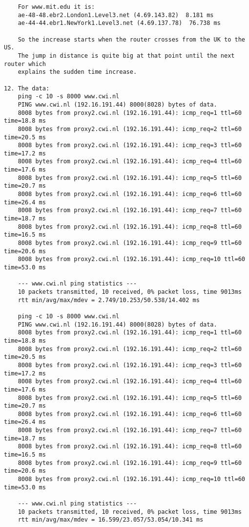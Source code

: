 \documentclass[12pt]{article} %
\begin{document}
\begin{verbatim}
    For www.mit.edu it is:
    ae-48-48.ebr2.London1.Level3.net (4.69.143.82)  8.181 ms 
    ae-44-44.ebr1.NewYork1.Level3.net (4.69.137.78)  76.738 ms 

    So the increase starts when the router crosses from the UK to the US.
    The jump in distance is quite big at that point until the next router which
    explains the sudden time increase.

12. The data:
    ping -c 10 -s 8000 www.cwi.nl
    PING www.cwi.nl (192.16.191.44) 8000(8028) bytes of data.
    8008 bytes from proxy2.cwi.nl (192.16.191.44): icmp_req=1 ttl=60 time=18.8 ms
    8008 bytes from proxy2.cwi.nl (192.16.191.44): icmp_req=2 ttl=60 time=20.5 ms
    8008 bytes from proxy2.cwi.nl (192.16.191.44): icmp_req=3 ttl=60 time=17.2 ms
    8008 bytes from proxy2.cwi.nl (192.16.191.44): icmp_req=4 ttl=60 time=17.6 ms
    8008 bytes from proxy2.cwi.nl (192.16.191.44): icmp_req=5 ttl=60 time=20.7 ms
    8008 bytes from proxy2.cwi.nl (192.16.191.44): icmp_req=6 ttl=60 time=26.4 ms
    8008 bytes from proxy2.cwi.nl (192.16.191.44): icmp_req=7 ttl=60 time=18.7 ms
    8008 bytes from proxy2.cwi.nl (192.16.191.44): icmp_req=8 ttl=60 time=16.5 ms
    8008 bytes from proxy2.cwi.nl (192.16.191.44): icmp_req=9 ttl=60 time=20.6 ms
    8008 bytes from proxy2.cwi.nl (192.16.191.44): icmp_req=10 ttl=60 time=53.0 ms

    --- www.cwi.nl ping statistics ---
    10 packets transmitted, 10 received, 0% packet loss, time 9013ms
    rtt min/avg/max/mdev = 2.749/10.253/50.538/14.402 ms

    ping -c 10 -s 8000 www.cwi.nl
    PING www.cwi.nl (192.16.191.44) 8000(8028) bytes of data.
    8008 bytes from proxy2.cwi.nl (192.16.191.44): icmp_req=1 ttl=60 time=18.8 ms
    8008 bytes from proxy2.cwi.nl (192.16.191.44): icmp_req=2 ttl=60 time=20.5 ms
    8008 bytes from proxy2.cwi.nl (192.16.191.44): icmp_req=3 ttl=60 time=17.2 ms
    8008 bytes from proxy2.cwi.nl (192.16.191.44): icmp_req=4 ttl=60 time=17.6 ms
    8008 bytes from proxy2.cwi.nl (192.16.191.44): icmp_req=5 ttl=60 time=20.7 ms
    8008 bytes from proxy2.cwi.nl (192.16.191.44): icmp_req=6 ttl=60 time=26.4 ms
    8008 bytes from proxy2.cwi.nl (192.16.191.44): icmp_req=7 ttl=60 time=18.7 ms
    8008 bytes from proxy2.cwi.nl (192.16.191.44): icmp_req=8 ttl=60 time=16.5 ms
    8008 bytes from proxy2.cwi.nl (192.16.191.44): icmp_req=9 ttl=60 time=20.6 ms
    8008 bytes from proxy2.cwi.nl (192.16.191.44): icmp_req=10 ttl=60 time=53.0 ms

    --- www.cwi.nl ping statistics ---
    10 packets transmitted, 10 received, 0% packet loss, time 9013ms
    rtt min/avg/max/mdev = 16.599/23.057/53.054/10.341 ms


\end{verbatim}
\end{document}

